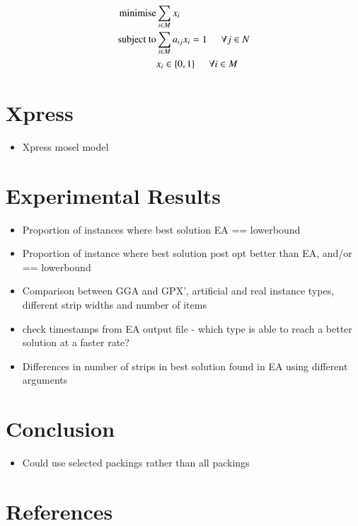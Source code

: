 \documentclass{elsarticle}
\begin{document}
\begin{align*}
	\text{minimise} &\sum_{i \in M} x_i \\
	\text{subject to} &\sum_{i \in M} a_{ij} x_i = 1 \hspace{5mm} \forall j \in N \\
	&x_i \in \{0,1\} \hspace{5mm} \forall i \in M
\end{align*}

\section{Xpress}
\begin{itemize}
	\item Xpress mosel model
\end{itemize}


\section{Experimental Results}
\begin{itemize}
	\item Proportion of instances where best solution EA == lowerbound
	\item Proportion of instance where best solution post opt better than EA, and/or == lowerbound
	\item Comparison between GGA and GPX', artificial and real instance types, different strip widths and number of items
	\item check timestamps from EA output file - which type is able to reach a better solution at a faster rate?
	\item Differences in number of strips in best solution found in EA using different arguments
\end{itemize}

\section{Conclusion}
\begin{itemize}
	\item Could use selected packings rather than all packings
\end{itemize}


\section*{References}

\end{document}
